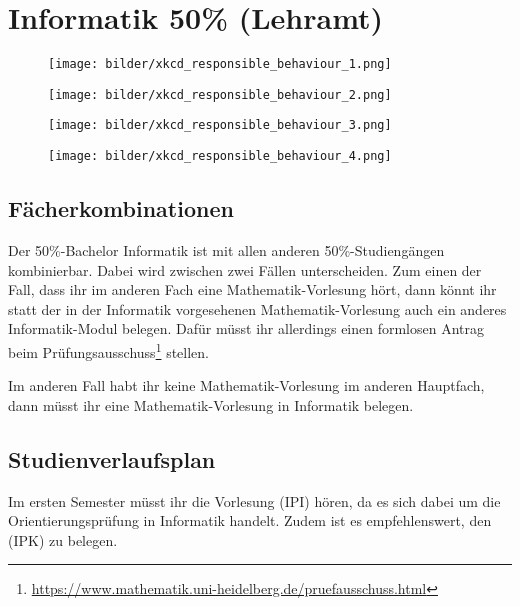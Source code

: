 \section{Informatik 50\% (Lehramt)}

\begin{figure*}[t]
    \centering
    \begin{subfigure}{.24\textwidth}
        \centering
        \texttt{[image: bilder/xkcd\_responsible\_behaviour\_1.png]}
    \end{subfigure}
    \begin{subfigure}{.24\textwidth}
        \centering
        \texttt{[image: bilder/xkcd\_responsible\_behaviour\_2.png]}
    \end{subfigure}
    \begin{subfigure}{.25\textwidth}
        \centering
        \texttt{[image: bilder/xkcd\_responsible\_behaviour\_3.png]}
    \end{subfigure}
    \begin{subfigure}{.25\textwidth}
        \centering
        \texttt{[image: bilder/xkcd\_responsible\_behaviour\_4.png]}
    \end{subfigure}
\end{figure*}

\subsection{Fächerkombinationen}
Der 50\%-Bachelor Informatik ist mit allen anderen 50\%-Studiengängen kombinierbar. Dabei wird zwischen zwei Fällen unterscheiden. Zum einen der Fall, dass ihr im anderen Fach eine Mathematik-Vorlesung hört, dann könnt ihr statt der in der Informatik vorgesehenen Mathematik-Vorlesung auch ein anderes Informatik-Modul belegen. Dafür müsst ihr allerdings einen formlosen Antrag beim Prüfungsausschuss\footnote{\url{https://www.mathematik.uni-heidelberg.de/pruefausschuss.html}} stellen.

Im anderen Fall habt ihr keine Mathematik-Vorlesung im anderen Hauptfach, dann müsst ihr eine Mathematik-Vorlesung in Informatik belegen.

\subsection{Studienverlaufsplan}
Im ersten Semester müsst ihr die Vorlesung  (\gls{IPI}) hören, da es sich dabei um die Orientierungsprüfung in Informatik handelt. Zudem ist es empfehlenswert, den  (\gls{IPK}) zu belegen.

